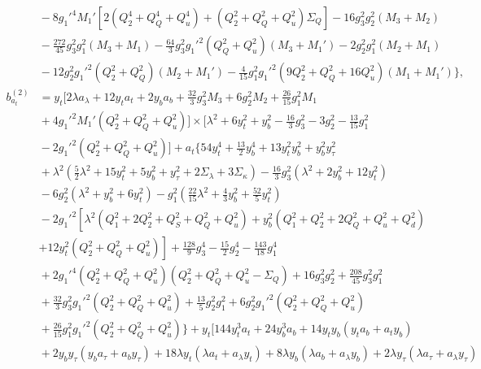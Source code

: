 \documentclass[preprint,amsmath,amssymb,aps,superscriptaddress,prd,showpacs,floatfix,nofootinbib]{revtex4-1}
\begin{document}
\begin{subequations}
\begin{align}
&{}-8g_1'^4M_1'\left [ 2\left ( Q_2^4+Q_Q^4+Q_u^4\right )+\left ( Q_2^2+Q_Q^2+Q_u^2\right )\Sigma_{Q}\right ]-16g_3^2g_2^2\left ( M_3+M_2\right )\nonumber\\
&{}-\frac{272}{45}g_3^2g_1^2\left ( M_3+M_1\right )-\frac{64}{3}g_3^2g_1'^2\left ( Q_Q^2+Q_u^2\right )\left ( M_3+M_1'\right )-2g_2^2g_1^2\left ( M_2+M_1\right )\nonumber\\
&{}-12g_2^2g_1'^2\left ( Q_2^2+Q_Q^2\right )\left ( M_2+M_1'\right )-\frac{4}{15}g_1^2g_1'^2\left ( 9Q_2^2+Q_Q^2+16Q_u^2\right )\left ( M_1+M_1'\right )\bigg \},\label{eq:USSMTYu22BetaTwoLoop}\\
b_{a_t}^{(2)}&=y_t\bigg [ 2\lambda a_\lambda + 12y_ta_t+2y_ba_b+\frac{32}{3}g_3^2M_3+6g_2^2M_2+\frac{26}{15}g_1^2M_1\nonumber\\
&{}+4g_1'^2M_1'\left ( Q_2^2+Q_Q^2+Q_u^2 \right )\bigg ]\times\bigg [ \lambda^2+6y_t^2+y_b^2-\frac{16}{3}g_3^2-3g_2^2-\frac{13}{15}g_1^2\nonumber\\
&{}-2g_1'^2\left ( Q_2^2+Q_Q^2+Q_u^2 \right )\bigg ]+a_t\bigg \{ 54y_t^4+\frac{13}{2}y_b^4+13y_t^2y_b^2+y_b^2y_\tau^2\nonumber\\
&{}+\lambda^2\left ( \frac{5}{2}\lambda^2+15y_t^2+5y_b^2+y_\tau^2+2\Sigma_\lambda+3\Sigma_\kappa \right )-\frac{16}{3}g_3^2\left ( \lambda^2+2y_b^2+12y_t^2\right )\nonumber\\
&{}-6g_2^2\left ( \lambda^2+y_b^2+6y_t^2\right )-g_1^2\left ( \frac{22}{15}\lambda^2+\frac{4}{3}y_b^2+\frac{52}{5}y_t^2\right )\nonumber\\
&{}-2g_1'^2\left [ \lambda^2 \left (Q_1^2+2Q_2^2+Q_S^2+Q_Q^2+Q_u^2 \right )+y_b^2\left ( Q_1^2+Q_2^2+2Q_Q^2+Q_u^2+Q_d^2\right )\right.\nonumber\\
&{}\left.+12y_t^2\left ( Q_2^2+Q_Q^2+Q_u^2\right )\right ]+\frac{128}{9}g_3^4-\frac{15}{2}g_2^4-\frac{143}{18}g_1^4\nonumber\\
&{}+2g_1'^4\left ( Q_2^2+Q_Q^2+Q_u^2\right )\left ( Q_2^2+Q_Q^2+Q_u^2-\Sigma_{Q}\right )+16g_3^2g_2^2+\frac{208}{45}g_3^2g_1^2\nonumber\\
&{}+\frac{32}{3}g_3^2g_1'^2\left ( Q_2^2+Q_Q^2+Q_u^2\right )+\frac{13}{5}g_2^2g_1^2+6g_2^2g_1'^2\left ( Q_2^2+Q_Q^2+Q_u^2 \right )\nonumber\\
&{}+\frac{26}{15}g_1^2g_1'^2\left ( Q_2^2+Q_Q^2+Q_u^2 \right )\bigg \}+y_t\bigg [ 144y_t^3a_t+24y_b^3a_b+14y_ty_b\left ( y_ta_b+a_ty_b\right )\nonumber\\
&{}+2y_by_\tau\left ( y_b a_\tau+a_by_\tau\right )+18\lambda y_t\left ( \lambda a_t+a_{\lambda}y_t\right )+8\lambda y_b\left ( \lambda a_b+a_{\lambda}y_b\right )+2\lambda y_\tau\left ( \lambda a_\tau+a_{\lambda}y_\tau\right )\nonumber\\

\end{align}
\end{subequations}
\end{document}
